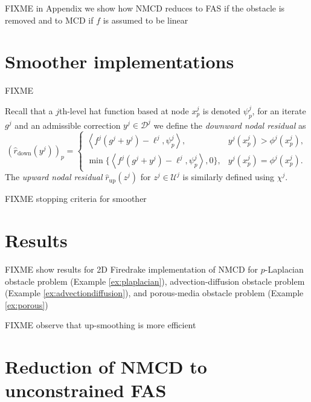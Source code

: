 \documentclass[letterpaper,final,12pt,reqno]{amsart}
\theoremstyle{cstyle}
\theoremstyle{cstyle*}
\theoremstyle{dstyle}
\numberwithin{equation}{section}
\numberwithin{figure}{section}
\numberwithin{table}{section}
\numberwithin{theorem}{section}
\newcommand{\ip}[2]{\left<#1,#2\right>}
\begin{document}
FIXME in Appendix we show how NMCD reduces to FAS if the obstacle is removed and to MCD if $f$ is assumed to be linear



\section{Smoother implementations} \label{sec:smoothers}

FIXME

Recall that a $j$th-level hat function based at node $x_p^j$ is denoted $\psi_p^j$, for an iterate $g^j$ and an admissible correction $y^j \in \mathcal{D}^j$ we define the \emph{downward nodal residual} as
\begin{equation}
(\hat r_{\text{down}}(y^j))_p = \begin{cases} \ip{f^j(g^j+y^j)-\ell^j}{\psi_p^j}, & y^j(x_p^j) > \phi^j(x_p^j), \\
                                  \min\{\ip{f^j(g^j+y^j)-\ell^j}{\psi_p^j},0\}, & y^j(x_p^j) = \phi^j(x_p^j). \end{cases} \label{eq:dncpresidual}
\end{equation}
The \emph{upward nodal residual} $\hat r_{\text{up}}(z^j)$ for $z^j \in \mathcal{U}^j$ is similarly defined using $\chi^j$.

FIXME stopping criteria for smoother


\section{Results} \label{sec:results}

FIXME show results for 2D Firedrake implementation of NMCD for $p$-Laplacian obstacle problem (Example \ref{ex:plaplacian}), advection-diffusion obstacle problem (Example \ref{ex:advectiondiffusion}), and porous-media obstacle problem (Example \ref{ex:porous})

FIXME observe that up-smoothing is more efficient







\appendix
\section{Reduction of NMCD to unconstrained FAS}
\end{document}
